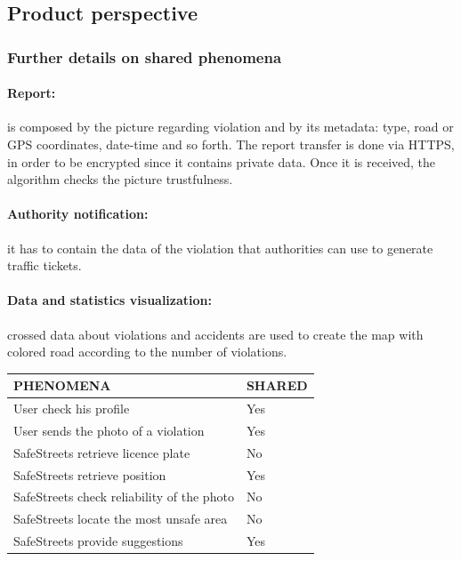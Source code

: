 \subsection{Product perspective}

\subsubsection{Further details on shared phenomena}

\paragraph{Report:}
is composed by the picture regarding violation and by its metadata: type, road or GPS coordinates, date-time and so forth.
The report transfer is done via HTTPS, in order to be encrypted since it contains private data.
Once it is received, the algorithm checks the picture trustfulness.

\paragraph{Authority notification:} it has to contain the data of the violation that authorities can use to generate traffic tickets.

\paragraph{Data and statistics visualization:} crossed data about violations and accidents are used to create the map with colored road according to the number of violations.


\begin{center}
	\begin{tabular}{ | l | p{6cm} | } 
		\hline
		PHENOMENA & SHARED  \\ 
		\hline
		User check his profile &   Yes \\
		\hline
		User sends the photo of a violation & Yes \\ 
		\hline
		SafeStreets retrieve licence plate & No \\ 
		\hline
		SafeStreets retrieve position & Yes \\ 
		\hline
		SafeStreets check reliability of the photo & No \\ 
		\hline
		SafeStreets locate the most unsafe area &  No\\ 
		\hline
		SafeStreets provide suggestions & Yes \\
		\hline
	\end{tabular}
\end{center}

